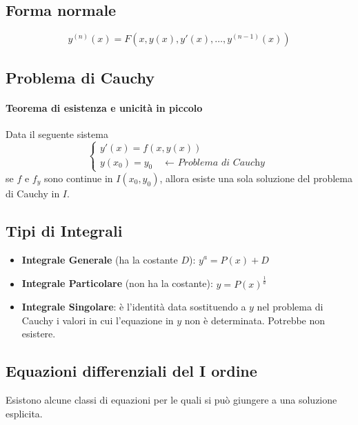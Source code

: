 \documentclass[10pt,a4paper,fleqn]{article}
\begin{document}
	\subsection{Forma normale}

	\begin{equation}
		y^{(n)}(x)=F\left(x,y(x),y'(x),\dots,y^{(n-1)}(x)\right)
	\end{equation}

	\subsection{Problema di Cauchy}

	\paragraph{Teorema di esistenza e unicità in piccolo} Data il seguente sistema
	\begin{equation}
		\begin{cases}
			y'(x)=f(x,y(x))\\
			y(x_0)=y_0 \quad \textit{$\longleftarrow$ Problema di Cauchy}
		\end{cases}
	\end{equation}
	se $f$ e $f_y$ sono continue in $I(x_0, y_0)$, allora esiste una sola soluzione del problema di Cauchy in $I$.

	\subsection{Tipi di Integrali}

	\begin{itemize}
		\item \textbf{Integrale Generale} (ha la costante $D$): \qquad $y^a = P(x) + D$
		\item \textbf{Integrale Particolare} (non ha la costante): \qquad $y=P(x)^\frac{1}{a}$
		\item \textbf{Integrale Singolare}: è l'identità data sostituendo a $y$ nel problema di Cauchy i valori in cui l'equazione in $y$ non è determinata. Potrebbe non esistere.
	\end{itemize}

	\subsection{Equazioni differenziali del I ordine}
	Esistono alcune classi di equazioni per le quali si può giungere a una soluzione esplicita.
\end{document}
